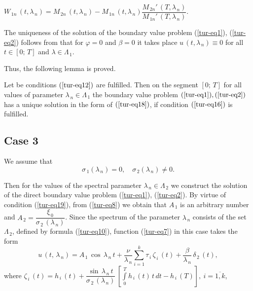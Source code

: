 ﻿\documentclass[
11pt,%
tightenlines,%
twoside,%
onecolumn,%
nofloats,%
nobibnotes,%
nofootinbib,%
superscriptaddress,%
noshowpacs,%
centertags]%
{revtex4}
\begin{document}
$W_{\, 1 n} \, (t , \lambda_{\, n})=M_{\, 2 n} \, (t , \lambda_{\, n})-
M_{\, 1 n} \, (t , \lambda_{\, n}) \dfrac{M_{\, 2 n}' \, (T , \lambda_{\, n})}{M_{\, 1 n}' \, (T , \lambda_{\, n})}$.

The uniqueness of the solution of the boundary value problem (\ref{tur-eq1}), (\ref{tur-eq2}) follows from that for $\varphi=0$ and $\beta=0$ it takes place $u \, (t , \lambda_{\, n}) \equiv 0$ for all $t \in [0 ; \, T]$ and $\lambda \in \Lambda_{\, 1}$.
	
	 Thus, the following lemma is proved.

\begin{lemma} Let be conditions $(\ref{tur-eq12})$ are fulfilled. Then on the segment  $[0 ; \, T]$ for all values of parameter $\lambda_{\, n} \in \Lambda_{\, 1}$ the boundary value problem $(\ref{tur-eq1}), (\ref{tur-eq2})$ has a unique solution in the form of $(\ref{tur-eq18})$, if condition  $(\ref{tur-eq16})$ is fulfilled.
\end{lemma}

\subsection{Case 3}
We assume that
 \begin{equation} \label{tur-eq19}
 \sigma_{\, 1} (\lambda_{\, n}) = 0 , \quad  \sigma_{\, 2} (\lambda_{\, n}) \ne 0 .
\end{equation}

Then for the values of the spectral parameter $\lambda_{\, n} \in \Lambda_{\, 2}$ we construct the solution of the direct boundary value problem (\ref{tur-eq1}), (\ref{tur-eq2}). By virtue of condition (\ref{tur-eq19}), from (\ref{tur-eq8}) we obtain that $A_{\, 1}$ is an arbitrary number and
$A_{\, 2}=\dfrac{\xi_{\, 0}}{\sigma_{\, 2} \, (\lambda_{\, n})}$. Since the spectrum of the parameter $\lambda_{\, n}$ consists of  the set $\Lambda_{\, 2}$, defined by formula (\ref{tur-eq10}), function (\ref{tur-eq7}) in this case takes the form
\begin{equation} \label{tur-eq20}
u \, (t , \, \lambda_{\, n})=A_{\, 1} \, \cos \, \lambda_{\, n} \, t+\dfrac{\nu}{\lambda_{\, n}} \sum \limits_{i=1}^{k}  \tau_{\, i} \, \zeta_{\, i} \, (t)+\dfrac{\beta}{\lambda_{\, n}} \, \delta_{\, 2} \, (t) ,
\end{equation}
where $\zeta_{\, i} \, (t)=h_{\, i} \, (t)+\dfrac{\sin \, \lambda_{\, n} \, t}{\sigma_{\, 2} \, (\lambda_{\, n})} \, \left[ \int \limits_{0}^T h_{\, i} \, (t) \, t \, d t-h_{\, i} \, (T) \right] , \: i=\overline{1 , k}$, 
\end{document}
